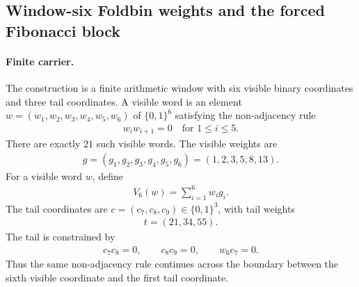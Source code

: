 
\subsection{Window-six Foldbin weights and the forced Fibonacci block}
\label{sec:window6-foldbin-weights-fibonacci-uniqueness}

\paragraph{Finite carrier.}
The construction is a finite arithmetic window with six visible binary coordinates and three tail coordinates. A visible word is an element $w=(w_1,w_2,w_3,w_4,w_5,w_6)$ of $\{0,1\}^6$ satisfying the non-adjacency rule
$$
\begin{aligned}
w_i w_{i+1}=0 \quad \text{for } 1\leq i\leq 5.
\end{aligned}
$$
There are exactly $21$ such visible words. The visible weights are
$$
\begin{aligned}
g=(g_1,g_2,g_3,g_4,g_5,g_6)=(1,2,3,5,8,13).
\end{aligned}
$$
For a visible word $w$, define
$$
\begin{aligned}
V_6(w)=\sum_{i=1}^6 w_i g_i.
\end{aligned}
$$
The tail coordinates are $c=(c_7,c_8,c_9)\in\{0,1\}^3$, with tail weights
$$
\begin{aligned}
t=(21,34,55).
\end{aligned}
$$
The tail is constrained by
$$
\begin{aligned}
c_7c_8=0,\qquad c_8c_9=0,\qquad w_6c_7=0.
\end{aligned}
$$
Thus the same non-adjacency rule continues across the boundary between the sixth visible coordinate and the first tail coordinate.

